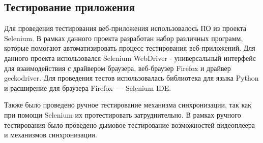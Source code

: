 \subsection{Тестирование приложения}
 
Для проведения тестирования веб-приложения использовалось ПО из проекта Selenium. 
В рамках данного проекта разработан набор различных программ, которые помогают автоматизировать процесс тестирования веб-приложений. 
Для данного проекта использовался Selenium WebDriver - универсальный интерфейс для взаимодействия с драйвером браузера, веб-браузер Firefox и драйвер geckodriver. 
Для проведения тестов использовалась библиотека для языка Python и расширение для браузера Firefox~--- Selenium IDE.
 
Также было проведено ручное тестирование механизма синхронизации, так как при помощи Selenium их протестировать затруднительно. 
В рамках ручного тестирования было проведено дымовое тестирование возможностей видеоплеера и механизмов синхронизации.
